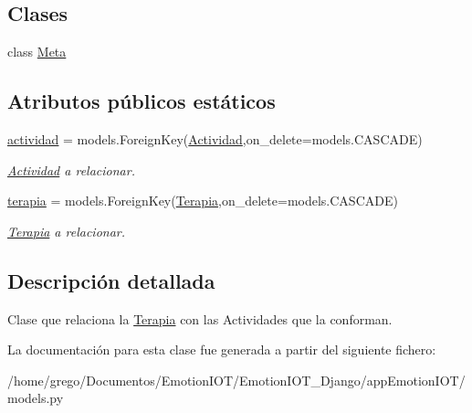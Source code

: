 \subsection*{Clases}
\begin{DoxyCompactItemize}
\item 
class \hyperlink{classappEmotionIOT_1_1models_1_1Terapia__Actividad_1_1Meta}{Meta}
\end{DoxyCompactItemize}
\subsection*{Atributos públicos estáticos}
\begin{DoxyCompactItemize}
\item 
\hyperlink{classappEmotionIOT_1_1models_1_1Terapia__Actividad_a1c98e2fb3a8ed0cbed743527e9501aef}{actividad} = models.\+Foreign\+Key(\hyperlink{classappEmotionIOT_1_1models_1_1Actividad}{Actividad},on\+\_\+delete=models.\+C\+A\+S\+C\+A\+DE)\hypertarget{classappEmotionIOT_1_1models_1_1Terapia__Actividad_a1c98e2fb3a8ed0cbed743527e9501aef}{}\label{classappEmotionIOT_1_1models_1_1Terapia__Actividad_a1c98e2fb3a8ed0cbed743527e9501aef}

\begin{DoxyCompactList}\small\item\em \hyperlink{classappEmotionIOT_1_1models_1_1Actividad}{Actividad} a relacionar. \end{DoxyCompactList}\item 
\hyperlink{classappEmotionIOT_1_1models_1_1Terapia__Actividad_ad2740902265727cf1592f5ae2f1c6260}{terapia} = models.\+Foreign\+Key(\hyperlink{classappEmotionIOT_1_1models_1_1Terapia}{Terapia},on\+\_\+delete=models.\+C\+A\+S\+C\+A\+DE)\hypertarget{classappEmotionIOT_1_1models_1_1Terapia__Actividad_ad2740902265727cf1592f5ae2f1c6260}{}\label{classappEmotionIOT_1_1models_1_1Terapia__Actividad_ad2740902265727cf1592f5ae2f1c6260}

\begin{DoxyCompactList}\small\item\em \hyperlink{classappEmotionIOT_1_1models_1_1Terapia}{Terapia} a relacionar. \end{DoxyCompactList}\end{DoxyCompactItemize}


\subsection{Descripción detallada}
Clase que relaciona la \hyperlink{classappEmotionIOT_1_1models_1_1Terapia}{Terapia} con las Actividades que la conforman. 

La documentación para esta clase fue generada a partir del siguiente fichero\+:\begin{DoxyCompactItemize}
\item 
/home/grego/\+Documentos/\+Emotion\+I\+O\+T/\+Emotion\+I\+O\+T\+\_\+\+Django/app\+Emotion\+I\+O\+T/models.\+py\end{DoxyCompactItemize}
